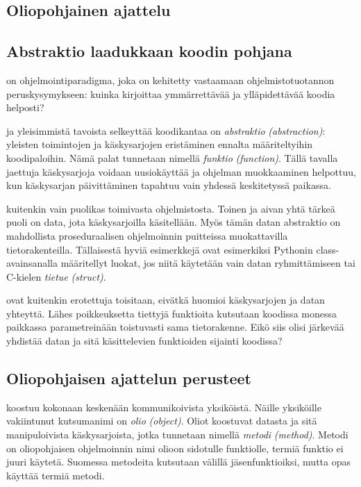 \documentclass[a4paper,justified,notoc]{tufte-book}
\newcommand{\eng}[1]{\textit{(#1)}}
\newcommand{\new}[1]{\textit{\gls{#1}}}
\newcommand{\neweng}[2]{\new{#1} \eng{#2}}
\begin{document}
\begin{fullwidth}
\mainmatter
\chapter{Oliopohjainen ajattelu}
\label{olioista}

\section{Abstraktio laadukkaan koodin pohjana}
\label{abstraktiosta}

 on ohjelmointiparadigma, joka on kehitetty vastaamaan
ohjelmistotuotannon peruskysymykseen: kuinka kirjoittaa ymmärrettävää ja ylläpidettävää koodia
helposti?

 ja yleisimmistä tavoista selkeyttää koodikantaa on
\neweng{abstraktio}{abstraction}: yleisten toimintojen ja käskysarjojen eristäminen ennalta
määriteltyihin koodipaloihin. Nämä palat tunnetaan nimellä \neweng{funktio}{function}. Tällä
tavalla jaettuja käskysarjoja voidaan uusiokäyttää ja ohjelman muokkaaminen helpottuu, kun
käskysarjan päivittäminen tapahtuu vain yhdessä keskitetyssä paikassa.

 kuitenkin vain puolikas toimivasta ohjelmistosta. Toinen ja aivan
yhtä tärkeä puoli on data, jota käskysarjoilla käsitellään. Myös tämän datan abstraktio on
mahdollista proseduraalisen ohjelmoinnin puitteissa muokattavilla tietorakenteilla. Tällaisestä
hyviä esimerkkejä ovat esimerkiksi Pythonin class-avainsanalla määritellyt luokat, jos niitä
käytetään vain datan ryhmittämiseen tai C-kielen \neweng{tietue}{struct}.

 ovat kuitenkin erotettuja toisitaan, eivätkä huomioi
käskysarjojen ja datan yhteyttä. Lähes poikkeuksetta tiettyjä funktioita kutsutaan koodissa
monessa paikkassa parametreinään toistuvasti sama tietorakenne. Eikö siis olisi järkevää yhdistää
datan ja sitä käsittelevien funktioiden sijainti koodissa?


\section{Oliopohjaisen ajattelun perusteet}
\label{oliopohjaisesta ajattelusta}

 koostuu kokonaan keskenään kommunikoivista yksiköistä.
Näille yksiköille vakiintunut kutsumanimi on \neweng{olio}{object}. Oliot koostuvat datasta ja
sitä manipuloivista käskysarjoista, jotka tunnetaan nimellä \neweng{metodi}{method}. Metodi on
oliopohjaisen ohjelmoinnin nimi olioon sidotulle funktiolle, termiä \gls{funktio} ei juuri
käytetä. Suomessa metodeita kutsutaan välillä jäsenfunktioiksi, mutta opas käyttää termiä metodi.


\end{fullwidth}
\end{document}
